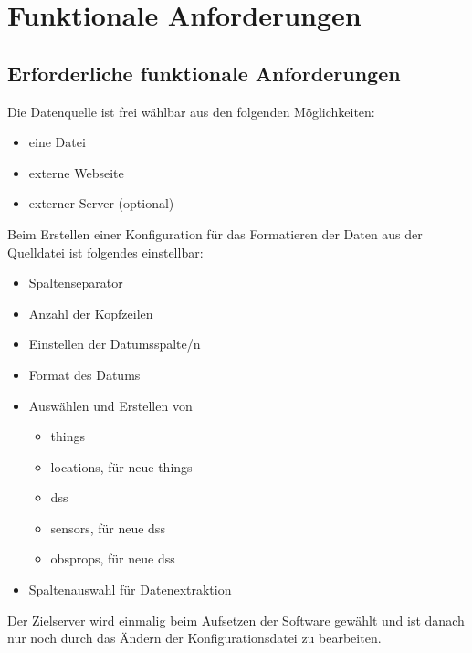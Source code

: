 \documentclass[a4paper, 12 pt]{article}
\begin{document}
\newpage
\section{Funktionale Anforderungen}
\subsection{Erforderliche funktionale Anforderungen}
	
	Die Datenquelle ist frei wählbar aus den folgenden Möglichkeiten:
		\begin{itemize}
			\item eine Datei
			\item externe Webseite
			\item externer Server (optional)
		\end{itemize}
		
	
	Beim Erstellen einer Konfiguration für das Formatieren der Daten aus der Quelldatei ist folgendes einstellbar:
	\begin{itemize}
			\item Spaltenseparator
			\item Anzahl der Kopfzeilen
			\item Einstellen der Datumsspalte/n
			\item Format des Datums
			\item Auswählen und Erstellen von
			\begin{itemize}
				\item \glspl{thing}
				\item \glspl{location}, für neue \glspl{thing}
				\item \glspl{ds}
				\item \gls{sensor}s, für neue \glspl{ds}
				\item \glspl{obsprop}, für neue \glspl{ds}
			\end{itemize}
			\item Spaltenauswahl für Datenextraktion
		\end{itemize}
	
	Der Zielserver wird einmalig beim Aufsetzen der Software gewählt und ist danach nur noch durch das Ändern der Konfigurationsdatei zu bearbeiten.
	
\end{document}
